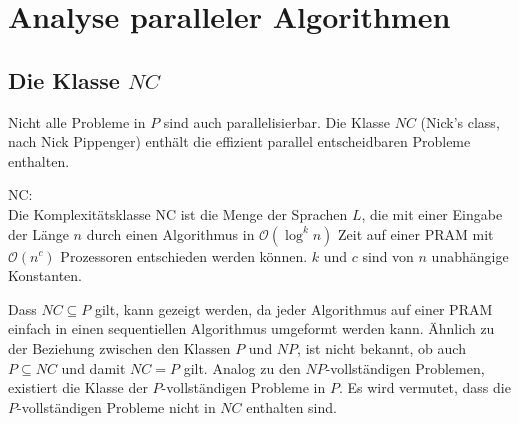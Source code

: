 \section{Analyse paralleler Algorithmen}

\subsection{Die Klasse $NC$}
Nicht alle Probleme in $P$ sind auch parallelisierbar.
Die Klasse $NC$ (Nick's class, nach Nick Pippenger) enthält die effizient parallel
entscheidbaren Probleme enthalten.
\begin{define}
    NC: \\
    Die Komplexitätsklasse NC ist die Menge der Sprachen $L$,
    die mit einer Eingabe der Länge $n$ durch einen Algorithmus
    in $\mathcal{O}\left( \log^k n \right)$ Zeit auf einer PRAM
    mit $\mathcal{O}\left( n^c \right)$ Prozessoren entschieden werden können.
    $k$ und $c$ sind von $n$ unabhängige Konstanten.
\end{define}
Dass $NC \subseteq P$ gilt, kann gezeigt werden, da jeder Algorithmus auf einer PRAM
einfach in einen sequentiellen Algorithmus umgeformt werden kann.
Ähnlich zu der Beziehung zwischen den Klassen $P$ und $NP$, ist nicht bekannt,
ob auch $P \subseteq NC$ und damit $NC = P$ gilt.
Analog zu den $NP$-vollständigen Problemen, existiert die Klasse der $P$-vollständigen Probleme in $P$.
Es wird vermutet, dass die $P$-vollständigen Probleme nicht in $NC$ enthalten sind.
\cite[S.535]{jaja}
